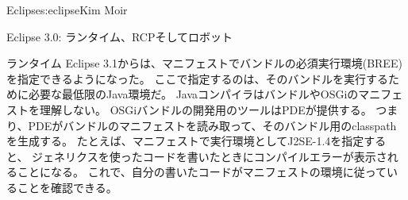 \begin{aosachapter}{Eclipse}{s:eclipse}{Kim Moir}
\begin{aosasect1}{Eclipse 3.0: ランタイム、RCPそしてロボット}
\begin{aosasect2}{ランタイム}
Eclipse 3.1からは、マニフェストでバンドルの必須実行環境(BREE)を指定できるようになった。
ここで指定するのは、そのバンドルを実行するために必要な最低限のJava環境だ。
JavaコンパイラはバンドルやOSGiのマニフェストを理解しない。
OSGiバンドルの開発用のツールはPDEが提供する。
つまり、PDEがバンドルのマニフェストを読み取って、そのバンドル用のclasspathを生成する。
たとえば、マニフェストで実行環境としてJ2SE-1.4を指定すると、
ジェネリクスを使ったコードを書いたときにコンパイルエラーが表示されることになる。
これで、自分の書いたコードがマニフェストの環境に従っていることを確認できる。


\end{aosasect2}
\end{aosasect1}
\end{aosachapter}
